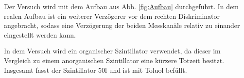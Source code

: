 Der Versuch wird mit dem Aufbau aus Abb. \ref{fig:Aufbau} durchgeführt. In
dem realen Aufbau ist ein weiterer Verzögerer vor dem rechten Diskriminator angebracht,
sodass eine Verzögerung der beiden Messkanäle relativ zu einander eingestellt werden kann.

In dem Versuch wird ein organischer Szintillator verwendet, da dieser
im Vergleich zu einem anorganischen Szintillator eine kürzere
Totzeit besitzt. Insgesamt fasst der Szintillator 50l und ist mit Toluol befüllt.
